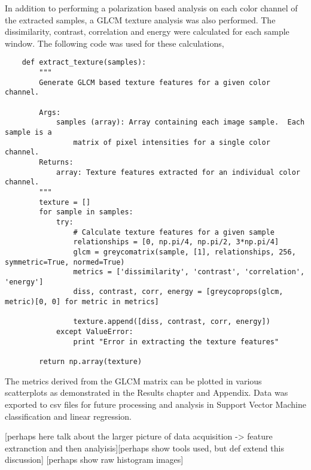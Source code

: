 In addition to performing a polarization based analysis on each color channel of the extracted samples, a GLCM texture analysis was also performed.  The dissimilarity, contrast, correlation and energy were calculated for each sample window.  The following code was used for these calculations,
\begin{lstlisting}
    def extract_texture(samples):
        """
        Generate GLCM based texture features for a given color channel.

        Args:
            samples (array): Array containing each image sample.  Each sample is a
                matrix of pixel intensities for a single color channel.
        Returns:
            array: Texture features extracted for an individual color channel.
        """
        texture = []
        for sample in samples:
            try:
                # Calculate texture features for a given sample
                relationships = [0, np.pi/4, np.pi/2, 3*np.pi/4]
                glcm = greycomatrix(sample, [1], relationships, 256, symmetric=True, normed=True)
                metrics = ['dissimilarity', 'contrast', 'correlation', 'energy']
                diss, contrast, corr, energy = [greycoprops(glcm, metric)[0, 0] for metric in metrics]

                texture.append([diss, contrast, corr, energy])
            except ValueError:
                print "Error in extracting the texture features"

        return np.array(texture)
\end{lstlisting}
The metrics derived from the GLCM matrix can be plotted in various scatterplots as demonstrated in the Results chapter and Appendix. Data was exported to csv files for future processing and analysis in Support Vector Machine classification and linear regression.

[perhaps here talk about the larger picture of data acquisition -> feature extranction and then analyisis][perhaps show tools used, but def extend this discussion]
[perhaps show raw histogram images]
